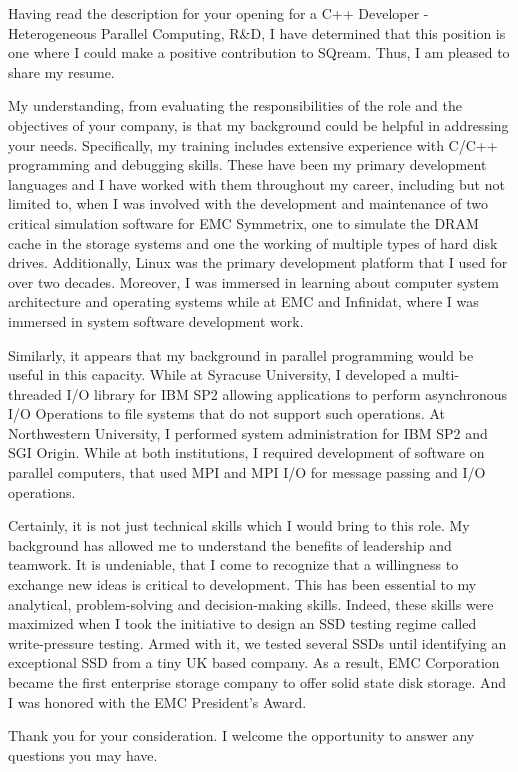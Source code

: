 \documentclass[busletter,dateno]{newlfm}
\begin{document}
\begin{newlfm}
Having read the description for your opening for a C++ Developer -
Heterogeneous Parallel Computing, R\&D, I have determined that this 
position is one where I could make a positive contribution to SQream.
Thus, I am pleased to share my resume.

My understanding, from evaluating the responsibilities of the role and the
objectives of your company, is that my background could be helpful in
addressing your needs. Specifically, my training includes extensive experience
with C/C++ programming and debugging skills. These have been my primary
development languages and I have worked with them throughout my career,
including but not limited to, when I was involved with the development and
maintenance of two critical simulation software for EMC Symmetrix, one to
simulate the DRAM cache in the storage systems and one the working of multiple
types of hard disk drives. Additionally, Linux was the primary development
platform that I used for over two decades. Moreover, I was immersed in
learning about computer system architecture and operating systems while at EMC
and Infinidat, where I was immersed in system software development work. 

Similarly, it appears that my background in parallel programming would be
useful in this capacity. While at Syracuse University, I developed a
multi-threaded I/O library for IBM SP2 allowing applications to perform
asynchronous I/O Operations to file systems that do not support such operations.
At Northwestern University, I performed system administration for IBM SP2 and
SGI Origin. While at both institutions, I required development of software on
parallel computers, that used MPI and MPI I/O for message passing and
I/O operations. 

Certainly, it is not just technical skills which I would bring to this role.
My background has allowed me to understand the benefits of leadership and
teamwork. It is undeniable, that I come to recognize that a willingness to
exchange new ideas is critical to development. This has been essential to my
analytical, problem-solving and decision-making skills. Indeed, these skills
were maximized when I took the initiative to design an SSD testing regime
called write-pressure testing. Armed with it, we tested several SSDs until
identifying an exceptional SSD from a tiny UK based company. As a result,
EMC Corporation became the first enterprise storage company to offer solid 
state disk storage. And I was honored with the EMC President's Award.

Thank you for your consideration.  I welcome the opportunity to answer any
questions you may have. 
\end{newlfm}
\end{document}
